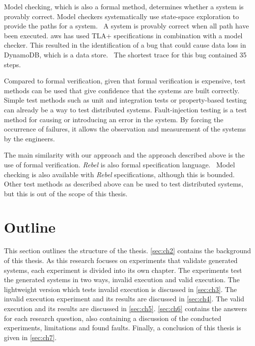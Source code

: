 Model checking, which is also a formal method, determines whether a system is
provably correct. Model checkers systematically use state-space exploration to
provide the paths for a system.~\cite[p.~3]{mccaffrey2016verification}
A system is provably correct when all path have been executed.
\gls{aws} has used TLA+ specifications in combination with a model checker. This
resulted in the identification of a bug that could cause data loss in DynamoDB,
which is a data store.~\cite[p.~7]{newcombe2014use}
The shortest trace for this bug contained 35 steps.

Compared to formal verification, given that formal verification is expensive,
test methods can be used that give confidence that the systems are built
correctly.~\cite[p.~4]{mccaffrey2016verification}
Simple test methods such as unit and integration tests or property-based testing
can already be a way to test distributed systems.
Fault-injection testing is a test method for causing or introducing an error in
the system. By forcing the occurrence of failures, it allows the observation
and measurement of the systems by the engineers.

The main similarity with our approach and the approach described above is the
use of formal verification. \textit{Rebel} is also formal specification
language.~\cite[p.~1]{stoel_storm_vinju_bosman_2016} Model checking is also
available with \textit{Rebel} specifications, although this is bounded. Other
test methods as described above can be used to test distributed systems, but
this is out of the scope of this thesis.

\section{Outline}
This section outlines the structure of the thesis. \autoref{sec:ch2} contains
the background of this thesis. As this research focuses on experiments that
validate generated systems, each experiment is divided into its own chapter.
The experiments test the generated systems in two ways, invalid execution and
valid execution. The lightweight version which tests invalid execution is
discussed in \autoref{sec:ch3}. The invalid execution experiment and its results
are discussed in \autoref{sec:ch4}. The valid execution and its results are
discussed in \autoref{sec:ch5}. \autoref{sec:ch6} contains the answers for each
research question, also containing a discussion of the conducted experiments,
limitations and found faults. Finally, a conclusion of this thesis is given in
\autoref{sec:ch7}.
